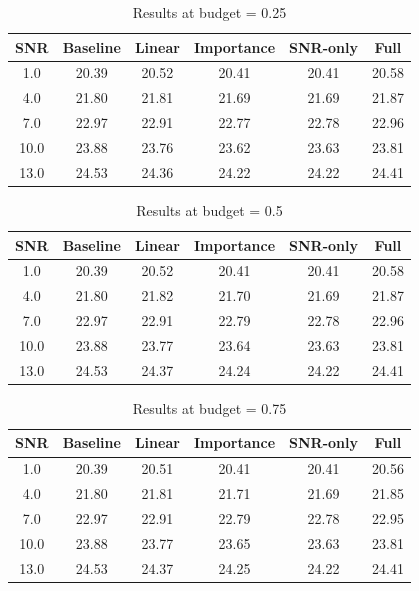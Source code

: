 \begin{table}[h]
\centering
\caption{Results at budget = 0.25}
\begin{tabular}{c|ccccc}
\hline
SNR & Baseline & Linear & Importance & SNR-only & Full \\
\hline
1.0 & 20.39 & 20.52 & 20.41 & 20.41 & 20.58 \\
4.0 & 21.80 & 21.81 & 21.69 & 21.69 & 21.87 \\
7.0 & 22.97 & 22.91 & 22.77 & 22.78 & 22.96 \\
10.0 & 23.88 & 23.76 & 23.62 & 23.63 & 23.81 \\
13.0 & 24.53 & 24.36 & 24.22 & 24.22 & 24.41 \\
\hline
\end{tabular}
\end{table}

\begin{table}[h]
\centering
\caption{Results at budget = 0.5}
\begin{tabular}{c|ccccc}
\hline
SNR & Baseline & Linear & Importance & SNR-only & Full \\
\hline
1.0 & 20.39 & 20.52 & 20.41 & 20.41 & 20.58 \\
4.0 & 21.80 & 21.82 & 21.70 & 21.69 & 21.87 \\
7.0 & 22.97 & 22.91 & 22.79 & 22.78 & 22.96 \\
10.0 & 23.88 & 23.77 & 23.64 & 23.63 & 23.81 \\
13.0 & 24.53 & 24.37 & 24.24 & 24.22 & 24.41 \\
\hline
\end{tabular}
\end{table}

\begin{table}[h]
\centering
\caption{Results at budget = 0.75}
\begin{tabular}{c|ccccc}
\hline
SNR & Baseline & Linear & Importance & SNR-only & Full \\
\hline
1.0 & 20.39 & 20.51 & 20.41 & 20.41 & 20.56 \\
4.0 & 21.80 & 21.81 & 21.71 & 21.69 & 21.85 \\
7.0 & 22.97 & 22.91 & 22.79 & 22.78 & 22.95 \\
10.0 & 23.88 & 23.77 & 23.65 & 23.63 & 23.81 \\
13.0 & 24.53 & 24.37 & 24.25 & 24.22 & 24.41 \\
\hline
\end{tabular}
\end{table}

